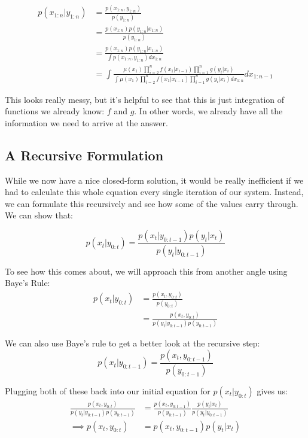 \documentclass{article}
\begin{document}
\begin{equation}
\begin{split}
p(x_{1:n}|y_{1:n}) &= \frac{p(x_{1:n},y_{1:n})}{p(y_{1:n})}\\
&= \frac{p(x_{1:n}) p(y_{1:n}|x_{1:n})}{p(y_{1:n})}\\
&= \frac{p(x_{1:n}) p(y_{1:n}|x_{1:n})}{\int p(x_{1:n},y_{1:n}) dx_{1:n}}\\
&= \int \frac{\mu(x_1)\prod_{i=2}^{n} f(x_1|x_{i-1})\prod_{i=1}^{n} g(y_i|x_i)}{\int \mu(x_1)\prod_{i=2}^{n} f(x_1|x_{i-1})\prod_{i=1}^{n} g(y_i|x_i) dx_{1:n}} dx_{1:n-1}
\end{split}
\end{equation}

This looks really messy, but it's helpful to see that this is just integration of functions we already know: $f$ and $g$. In other words, we already have all the information we need to arrive at the answer. 

\subsection{A Recursive Formulation}
While we now have a nice closed-form solution, it would be really inefficient if we had to calculate this whole equation every single iteration of our system. Instead, we can formulate this recursively and see how some of the values carry through. We can show that:

\begin{equation}
p(x_t|y_{0:t}) = \frac{p(x_t|y_{0:t-1})p(y_t|x_t)}{p(y_t|y_{0:t-1})}
\end{equation}

To see how this comes about, we will approach this from another angle using Baye's Rule:
\begin{equation}
\begin{split}
p(x_t|y_{0:t}) &= \frac{p(x_t,y_{0:t})}{p(y_{0:t})}\\
&= \frac{p(x_t,y_{0:t})}{p(y_t|y_{0:t-1})p(y_{0:t-1})}
\end{split}
\end{equation}

We can also use Baye's rule to get a better look at the recursive step:
\begin{equation}
p(x_t|y_{0:t-1}) = \frac{p(x_t,y_{0:t-1})}{p(y_{0:t-1})}
\end{equation}

Plugging both of these back into our initial equation for $p(x_t|y_{0:t})$ gives us:
\begin{equation}
\begin{split}
\frac{p(x_t,y_{0:t})}{p(y_t|y_{0:t-1})p(y_{0:t-1})} 
&= \frac{p(x_t,y_{0:t-1})}{p(y_{0:t-1})}\frac{p(y_t|x_t)}{p(y_t|y_{0:t-1})}\\
\implies
p(x_t,y_{0:t}) &= p(x_t,y_{0:t-1})p(y_t|x_t)
\end{split}
\end{equation}
\end{document}
